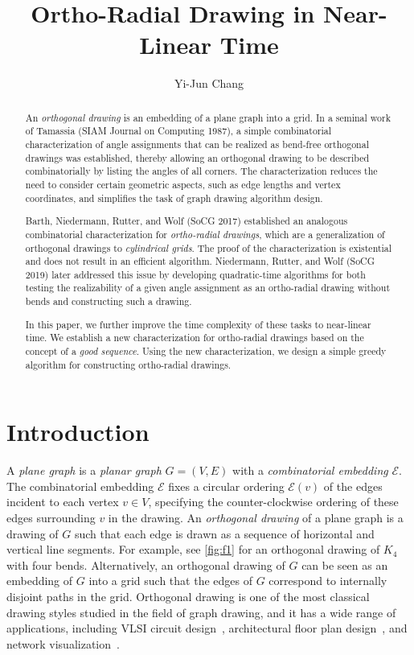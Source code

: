 \documentclass{article}\usepackage[a4paper,margin=20mm]{geometry}
\title{Ortho-Radial Drawing in Near-Linear Time}
\author{Yi-Jun Chang}\date{}
\newcommand{\EE}{\mathcal{E}}
\begin{document}
\maketitle

\begin{abstract}
An \emph{orthogonal drawing} is an embedding of a plane graph into a grid. In a seminal work of Tamassia (SIAM Journal on Computing 1987), a simple combinatorial characterization of angle assignments that can be realized as bend-free orthogonal drawings was established, thereby allowing an orthogonal drawing to be described combinatorially by listing the angles of all corners. The characterization reduces the need to consider certain geometric aspects, such as edge lengths and vertex coordinates, and simplifies the task of graph drawing algorithm design.

Barth, Niedermann, Rutter, and Wolf (SoCG 2017) established an analogous combinatorial characterization for \emph{ortho-radial drawings}, which are a generalization of orthogonal drawings to \emph{cylindrical grids}. The proof of the characterization is existential and does not result in  an efficient algorithm. Niedermann, Rutter, and Wolf (SoCG 2019) later addressed this issue by developing quadratic-time algorithms for both testing the realizability of a given angle assignment as an ortho-radial drawing without bends and constructing such a drawing.

In this paper, we further improve the time complexity of these tasks to near-linear time. We establish a new characterization for ortho-radial drawings based on the concept of a \emph{good sequence}. Using the new characterization, we design a simple greedy algorithm for constructing ortho-radial drawings.
\end{abstract}


\section{Introduction}\label{sect:intro}

A \emph{plane graph} is a \emph{planar graph} $G=(V,E)$ with a \emph{combinatorial embedding} $\EE$. The combinatorial embedding $\EE$ fixes a circular ordering $\EE(v)$ of the edges incident to each vertex $v \in V$, specifying the counter-clockwise ordering of these edges surrounding $v$ in the drawing.
An \emph{orthogonal drawing} of a plane graph is a drawing of $G$ such that each edge is drawn as a sequence of horizontal and vertical line segments. For example, see \cref{fig:f1} for an orthogonal drawing of $K_4$ with four bends. Alternatively, an orthogonal drawing of $G$ can be seen as an embedding of $G$ into a grid such that the edges of $G$ correspond to internally disjoint paths in the grid.
Orthogonal drawing is one of the most classical drawing styles studied in the field of graph drawing, and it has a wide range of applications, including VLSI circuit design~\cite{bhatt1984framework,valiant1981universality}, architectural floor plan design~\cite{LIGGETT1981277}, and network visualization~\cite{batini1986layout,eiglsperger2004automatic,gutwenger2003new,kieffer2015hola}.
\end{document}
